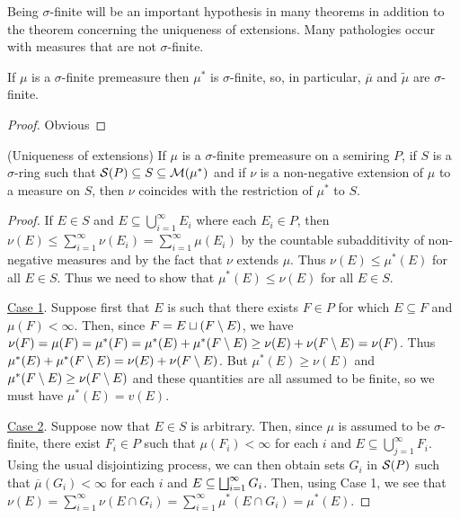 Being $\sigma$-finite will be an important hypothesis in many theorems in addition to the theorem concerning the uniqueness of extensions. Many pathologies occur with measures that are not $\sigma$-finite.

\begin{proposition}
If $\mu$ is a $\sigma$-finite premeasure then $\mu^*$ is $\sigma$-finite, so, in particular, $\overline{\mu}$ and $\widetilde{\mu}$ are $\sigma$-finite.
\end{proposition}
\begin{proof}
Obvious
\end{proof}

\begin{theorem}(Uniqueness of extensions)
\label{thm:unique extension}
If $\mu$ is a $\sigma$-finite premeasure on a semiring $P$, if $S$ is a $\sigma$-ring such that ${\cal S}(P)\subseteq S\subseteq {\cal M}(\mu^*)$ and if $\nu$ is a non-negative extension of $\mu$ to a measure on ${S}$, then $\nu$ coincides with the restriction of $\mu^*$ to ${S}$.
\end{theorem}

\begin{proof}
If $E \in S$ and $E \subseteq \bigcup_{i=1}^\infty E_i$ where each $E_i \in P$, then $\nu(E) \leq \sum_{i=1}^\infty \nu(E_i)=\sum_{i=1}^\infty \mu(E_i)$ by the countable subadditivity of non-negative measures and by the fact that $\nu$ extends $\mu$. Thus $\nu(E) \leq \mu^*(E)$ for all $E \in S$. Thus we need to show that $\mu^*(E) \leq \nu(E)$ for all $E \in S$.

\underline{Case 1}. Suppose first that $E$ is such that there exists $F \in P$ for which $E \subseteq F$ and $\mu(F)<\infty$. Then, since $F=E \sqcup(F\setminus E)$, we have $\nu(F)=\mu(F)=\mu^*(F)=\mu^*(E)+\mu^*(F\setminus E) \geq \nu(E)+\nu(F\setminus E)=\nu(F)$. Thus $\mu^*(E)+\mu^*(F\setminus E)=\nu(E)+\nu(F\setminus E)$. But $\mu^*(E) \geq \nu(E)$ and $\mu^*(F\setminus E) \geq \nu(F\setminus E)$ and these quantities are all assumed to be finite, so we must have $\mu^*(E)=v(E) .$

\underline{Case 2}. Suppose now that $E \in S$ is arbitrary. Then, since $\mu$ is assumed to be $\sigma$-finite, there exist $F_i \in P$ such that $\mu(F_i)<\infty$ for each $i$ and $E\subseteq\bigcup_{j=1}^\infty F_i .$ Using the usual disjointizing process, we can then obtain sets ${G}_i$ in ${\cal S}(P)$ such that $\overline{\mu}(G_i)<\infty$ for each $i$ and $E \subseteq \bigsqcup_{i=1}^\infty {G}_i$. Then, using Case 1, we see that $\nu(E)=\sum_{i=1}^\infty\nu(E\cap G_i)=\sum_{i=1}^\infty \mu^*(E \cap G_i)=\mu^*(E)$.
\end{proof}

